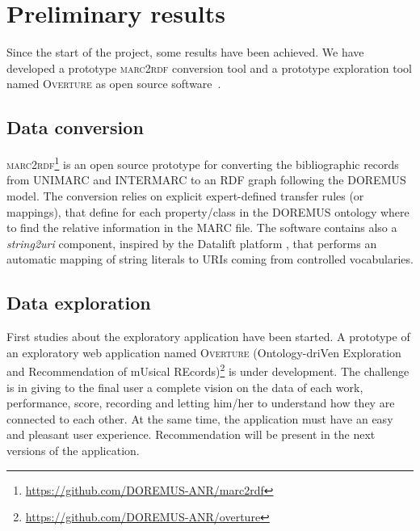 \documentclass{llncs}
\begin{document}


\section{Preliminary results}
\label{sec:results}
Since the start of the project, some results have been achieved. We have developed a prototype \textsc{marc2rdf} conversion tool and a prototype exploration tool named \textsc{Overture} as open source software~\cite{lisena2016exploring}. 

\subsection{Data conversion}
\textsc{marc2rdf}\footnote{\url{https://github.com/DOREMUS-ANR/marc2rdf}} is an open source prototype for converting the bibliographic records from UNIMARC and INTERMARC to an RDF graph following the DOREMUS model. The conversion relies on explicit expert-defined transfer rules (or mappings), that define for each property/class in the DOREMUS ontology where to find the relative information in the MARC file. The software contains also a \textit{string2uri} component, inspired by the Datalift platform \cite{scharffe2012enabling}, that performs an automatic mapping of string literals to URIs coming from controlled vocabularies.

\subsection{Data exploration}
First studies about the exploratory application have been started. A prototype of an exploratory web application named \textsc{Overture} (Ontology-driVen Exploration and Recommendation of mUsical REcords)\footnote{\url{https://github.com/DOREMUS-ANR/overture}} is under development. The challenge is in giving to the final user a complete vision on the data of each work, performance, score, recording and letting him/her to understand how they are connected to each other. At the same time, the application must have an easy and pleasant user experience. 
Recommendation will be present in the next versions of the application.
\end{document}
